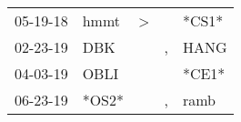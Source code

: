 \begin{supertabular}{p{0.07\textwidth}p{0.06\textwidth}p{0.02\textwidth}p{0.02\textwidth}p{0.06\textwidth}}
 05-19-18\textsuperscript{} &           hmmt\textsuperscript{} &     \textgreater &               &                   *CS1* \\
 02-23-19\textsuperscript{} &            DBK\textsuperscript{} &                  &             , &  HANG\textsuperscript{} \\
 04-03-19\textsuperscript{} &           OBLI\textsuperscript{} &                  &               &                   *CE1* \\
 06-23-19\textsuperscript{} &                            *OS2* &                  &             , &  ramb\textsuperscript{} \\
\end{supertabular}
